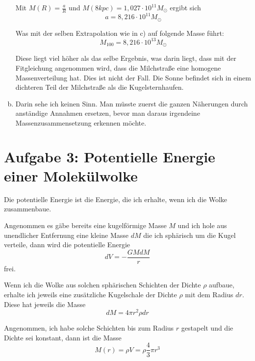 \documentclass[a4paper,german,12pt,smallheadings]{scrartcl}
\begin{document}
\begin{enumerate}[a)]
    Mit $M(R) = \frac{a}{R}$ und $M(8 kpc) = 1{,}027 \cdot 10^{11} M_\odot$ ergibt sich
    \begin{equation}
      a = 8{,}216 \cdot 10^{11} M_\odot
    \end{equation}

    Was mit der selben Extrapolation wie in c) auf folgende Masse führt:
    \begin{equation}
      M_{100} = 8{,}216 \cdot 10^{13} M_\odot
    \end{equation}

    Diese liegt viel höher als das selbe Ergebnis, was darin liegt, dass mit
    der Fitgleichung angenommen wird, dass die Milchstraße eine homogene
    Massenverteilung hat. Dies ist nicht der Fall. Die Sonne befindet sich in
    einem dichteren Teil der Milchstraße als die Kugelsternhaufen.

  \item
    Darin sehe ich keinen Sinn. Man müsste zuerst die ganzen Näherungen durch
    anständige Annahmen ersetzen, bevor man daraus irgendeine
    Massenzusammensetzung erkennen möchte.
\end{enumerate}

\section*{Aufgabe 3: Potentielle Energie einer Molekülwolke}
Die potentielle Energie ist die Energie, die ich erhalte, wenn ich die Wolke
zusammenbaue.

Angenommen es gäbe bereits eine kugelförmige Masse $M$ und ich hole aus
unendlicher Entfernung eine kleine Masse $dM$ die ich sphärisch um die Kugel
verteile, dann wird die potentielle Energie
\begin{equation}
  dV = - \frac{G M dM}{r}
\end{equation}
frei.

Wenn ich die Wolke aus solchen sphärischen Schichten der Dichte $\rho$ aufbaue,
erhalte ich jeweils eine zusätzliche Kugelschale der Dichte $\rho$ mit dem
Radius $dr$. Diese hat jeweils die Masse
\begin{equation}
  dM = 4 \pi r^2 \rho dr
\end{equation}

Angenommen, ich habe solche Schichten bis zum Radius $r$ gestapelt und die
Dichte sei konstant, dann ist die Masse
\begin{equation}
  M(r) = \rho V = \rho \frac{4}{3} \pi r^3
\end{equation}
\end{document}
